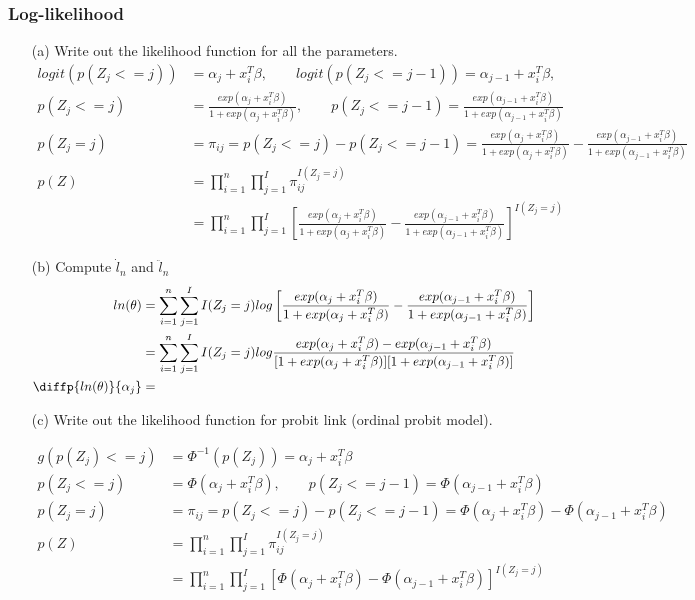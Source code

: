 \documentclass{article}
\begin{document}
\subsubsection{Log-likelihood}
\begin{itemize}
\item[(a)] Write out the likelihood function for all the parameters.
\begin{align*}
   logit ( p(Z_j <= j)) &= \alpha_j + x_i^T \beta, \qquad  logit( p(Z_j <= j-1) ) = \alpha_{j-1} + x_i^T \beta, \\
  p(Z_j <= j) &= \frac{exp(\alpha_j + x_i^T \beta)}{1+ exp(\alpha_j + x_i^T \beta)}, \qquad p(Z_j <= j-1) = \frac{exp(\alpha_{j-1} + x_i^T \beta)}{1+ exp(\alpha_{j-1} + x_i^T \beta)}\\
   p(Z_j = j) & =\pi_{ij}=  p(Z_j <= j) -   p(Z_j <= j-1) = \frac{exp(\alpha_j + x_i^T \beta)}{1+ exp(\alpha_j + x_i^T \beta)} -  \frac{exp(\alpha_{j-1} + x_i^T \beta)}{1+ exp(\alpha_{j-1} + x_i^T \beta)}\\
   p(Z) &= \prod_{i=1}^n \prod_{j=1}^I   \pi_{ij}^{I(Z_j= j)} \\
&= \prod_{i=1}^n  \prod_{j=1}^I  \left[ \frac{exp(\alpha_j + x_i^T \beta)}{1+ exp(\alpha_j + x_i^T \beta)} -  \frac{exp(\alpha_{j-1} + x_i^T \beta)}{1+ exp(\alpha_{j-1} + x_i^T \beta)} \right]^{I(Z_j= j)}
\end{align*}


\item[(b)] Compute $\dot{l}_n$ and $\ddot{l}_n$
\begin{align*}
ln(\theta) &= \sum_{i=1}^n  \sum_{j=1}^ I I(Z_j= j) log \left[ \frac{exp(\alpha_j + x_i^T \beta)}{1+ exp(\alpha_j + x_i^T \beta)} -  \frac{exp(\alpha_{j-1} + x_i^T \beta)}{1+ exp(\alpha_{j-1} + x_i^T \beta)} \right]\\
&= \sum_{i=1}^n  \sum_{j=1}^ I  I(Z_j= j) log \frac{exp(\alpha_j + x_i^T \beta) - exp(\alpha_{j-1} + x_i^T \beta)}{[1+ exp(\alpha_j + x_i^T \beta)] [1+ exp(\alpha_{j-1} + x_i^T \beta)]}\\
\diffp{ln(\theta)}{{\alpha_j}} &= 
\end{align*}

\item[(c)] Write out the likelihood function for probit link (ordinal probit model).

\begin{align*}
   g(p(Z_j) <= j) &= \Phi^{-1}(p(Z_j)) = \alpha_j + x_i^T \beta \\
  p(Z_j <= j) &= \Phi(\alpha_j + x_i^T \beta), \qquad p(Z_j <= j-1) = \Phi(\alpha_{j-1} + x_i^T \beta) \\
   p(Z_j = j) & =\pi_{ij}=  p(Z_j <= j) -   p(Z_j <= j-1) = \Phi(\alpha_j + x_i^T \beta) -  \Phi(\alpha_{j-1} + x_i^T \beta) \\
   p(Z) &= \prod_{i=1}^n \prod_{j=1}^I   \pi_{ij}^{I(Z_j= j)} \\
&= \prod_{i=1}^n  \prod_{j=1}^I  \left[ \Phi(\alpha_j + x_i^T \beta) -  \Phi(\alpha_{j-1} + x_i^T \beta)\right]^{I(Z_j= j)}
\end{align*}


\end{itemize}
\end{document}
